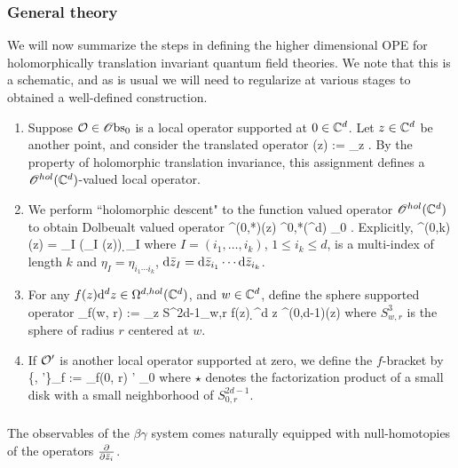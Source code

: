 \documentclass[10pt]{amsart}
\begin{document}
\subsubsection{General theory}

We will now summarize the steps in defining the higher dimensional OPE for holomorphically translation invariant quantum field theories. 
We note that this is a schematic, and as is usual we will need to regularize at various stages to obtained a well-defined construction. 

\begin{enumerate}
\item Suppose $\mathcal O \in {\mathscr O}{\rm bs}_0$ is a local operator supported at $0 \in \mathbb C^d$. 
Let $z \in \mathbb C^d$ be another point, and consider the translated operator 
\ben
\cO(z) := \tau_z \cO .
\een 
By the property of holomorphic translation invariance, this assignment defines a $\mathscr O^{hol}(\mathbb C^d)$-valued local operator. 

\item We perform ``holomorphic descent" to the function valued operator $\mathscr O^{hol}(\mathbb C^d)$ to obtain Dolbeualt valued operator 
\ben
\cO^{(0,*)}(z) \in \Omega^{0,*}(\CC^d) \tensor \sObs_0 .
\een 
Explicitly, 
\ben
\cO^{(0,k)} (z) = \sum_{I} (\Bar{\eta}_I \cdot \cO(z)) \d \zbar_I
\een
where $I = (i_1,\ldots,i_k)$, $1 \leq i_k \leq d$, is a multi-index of length $k$ and $\eta_I = \eta_{i_1\cdots i_k}$, ${\rm d} \Bar{z}_I = {\rm d} \Bar{z}_{i_1} \cdots {\rm d} \Bar{z}_{i_k}$. 

\item For any $f(z) {\rm d}^d z \in \Omega^{d,hol}(\mathbb C^d)$, and $w \in \mathbb C^d$, define the sphere supported operator
\ben
\cO_{f}(w, r) := \int_{z \in S^{2d-1}_{w,r}} f(z) \d^d z \cO^{(0,d-1)}(z)
\een 
where $S^3_{w,r}$ is the sphere of radius $r$ centered at $w$. 

\item If $\mathcal O'$ is another local operator supported at zero, we define the $f$-bracket by
\ben
\{\cO, \cO'\}_f := \cO_f(0, r) \star \cO' \in \sObs_0
\een
where $\star$ denotes the factorization product of a small disk with a small neighborhood of $S^{2d-1}_{0,r}$. 

\end{enumerate}

\subsubsection{}

The observables of the $\beta\gamma$ system comes naturally equipped with null-homotopies of the operators $\frac{\partial}{\partial \Bar{z}_i}$. 
\end{document}
